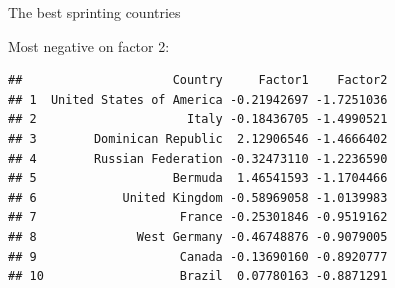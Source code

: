 \documentclass[ignorenonframetext,]{beamer}
\newenvironment{Shaded}{\begin{snugshade}}{\end{snugshade}}
\newcommand{\DataTypeTok}[1]{\textcolor[rgb]{0.13,0.29,0.53}{#1}}
\newcommand{\DecValTok}[1]{\textcolor[rgb]{0.00,0.00,0.81}{#1}}
\newcommand{\KeywordTok}[1]{\textcolor[rgb]{0.13,0.29,0.53}{\textbf{#1}}}
\newcommand{\NormalTok}[1]{#1}
\newcommand{\OperatorTok}[1]{\textcolor[rgb]{0.81,0.36,0.00}{\textbf{#1}}}
\newcommand{\StringTok}[1]{\textcolor[rgb]{0.31,0.60,0.02}{#1}}
\begin{document}
\begin{frame}[fragile]{The best sprinting countries}
\protect\hypertarget{the-best-sprinting-countries}{}

Most negative on factor 2:

\footnotesize

\begin{Shaded}
\end{Shaded}

\begin{verbatim}
##                     Country     Factor1    Factor2
## 1  United States of America -0.21942697 -1.7251036
## 2                     Italy -0.18436705 -1.4990521
## 3        Dominican Republic  2.12906546 -1.4666402
## 4        Russian Federation -0.32473110 -1.2236590
## 5                   Bermuda  1.46541593 -1.1704466
## 6            United Kingdom -0.58969058 -1.0139983
## 7                    France -0.25301846 -0.9519162
## 8              West Germany -0.46748876 -0.9079005
## 9                    Canada -0.13690160 -0.8920777
## 10                   Brazil  0.07780163 -0.8871291
\end{verbatim}

\normalsize

\end{frame}
\end{document}
